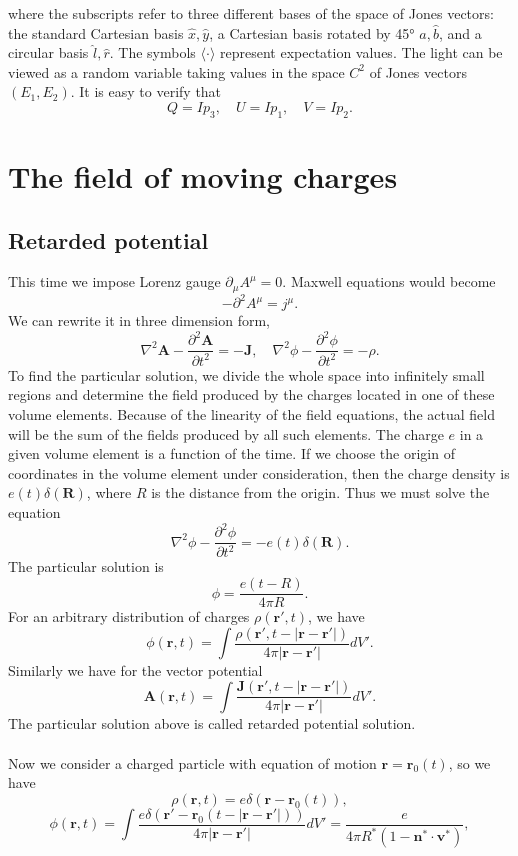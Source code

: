 where the subscripts refer to three different bases of the space of Jones vectors: the standard Cartesian basis ${\hat {x}},{\hat {y}}$, a Cartesian basis rotated by 45° ${\hat {a}},{\hat {b}}$, and a circular basis ${\hat {l}},{\hat {r}}$. The symbols $\langle \cdot \rangle$ represent expectation values. The light can be viewed as a random variable taking values in the space $C^2$ of Jones vectors $(E_1,E_2)$. It is easy to verify that
\[Q = Ip_3 , \quad U = Ip_1 , \quad V = Ip_2.\]

\section{The field of moving charges}
\subsection{Retarded potential}
This time we impose Lorenz gauge $\partial_{\mu} A^{\mu} = 0$. Maxwell equations would become
\[-\partial^2 A^{\mu} = j^{\mu}.\]
We can rewrite it in three dimension form,
\[\nabla^2 \bm{A} - \frac{\partial^2 \bm{A}}{\partial t^2} = -\bm{J} , \quad \nabla^2 \phi - \frac{\partial^2\phi}{\partial t^2} = -\rho.\]
To find the particular solution, we divide the whole space into infinitely small regions and determine the field produced by the charges located in one of these volume elements. Because of the linearity of the field equations, the actual field will be the sum of the fields produced by all such elements.
The charge $e$ in a given volume element is a function of the time. If we choose the origin of coordinates in the volume element under consideration, then the charge density is $e(t)\delta(\bm{R})$, where $R$ is the distance from the origin. Thus we must solve the equation
\[\nabla^2 \phi - \frac{\partial^2\phi}{\partial t^2} = -e(t)\delta(\bm{R}).\]
The particular solution is
\[\phi = \frac{e(t-R)}{4\pi R}.\]
For an arbitrary distribution of charges $\rho(\bm{r}',t)$, we have
\[\phi(\bm{r},t) = \int \frac{\rho(\bm{r}',t-|\bm{r}-\bm{r}'|)}{4\pi |\bm{r}-\bm{r}'|} dV'.\]
Similarly we have for the vector potential
\[\bm{A}(\bm{r},t) = \int \frac{\bm{J}(\bm{r}',t-|\bm{r}-\bm{r}'|)}{4\pi |\bm{r}-\bm{r}'|} dV'.\]
The particular solution above is called retarded potential solution.
\\ \\
Now we consider a charged particle with equation of motion $\bm{r} = \bm{r}_0(t)$, so we have
\[\rho(\bm{r},t) = e\delta(\bm{r}-\bm{r}_0(t)),\]
\[\phi(\bm{r},t) = \int \frac{e \delta (\bm{r}'-\bm{r}_0(t-|\bm{r}-\bm{r}'|))}{4\pi |\bm{r}-\bm{r}'|} dV' = \frac{e}{4\pi R^* (1 - \bm{n}^{*}\cdot\bm{v}^{*})},\]
